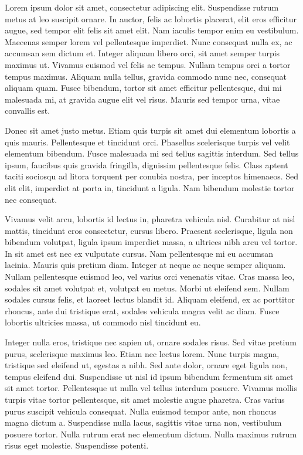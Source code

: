 

Lorem ipsum dolor sit amet, consectetur adipiscing elit. Suspendisse rutrum metus at leo suscipit ornare. In auctor, felis ac lobortis placerat, elit eros efficitur augue, sed tempor elit felis sit amet elit. Nam iaculis tempor enim eu vestibulum. Maecenas semper lorem vel pellentesque imperdiet. Nunc consequat nulla ex, ac accumsan sem dictum et. Integer aliquam libero orci, sit amet semper turpis maximus ut. Vivamus euismod vel felis ac tempus. Nullam tempus orci a tortor tempus maximus. Aliquam nulla tellus, gravida commodo nunc nec, consequat aliquam quam. Fusce bibendum, tortor sit amet efficitur pellentesque, dui mi malesuada mi, at gravida augue elit vel risus. Mauris sed tempor urna, vitae convallis est.

Donec sit amet justo metus. Etiam quis turpis sit amet dui elementum lobortis a quis mauris. Pellentesque et tincidunt orci. Phasellus scelerisque turpis vel velit elementum bibendum. Fusce malesuada mi sed tellus sagittis interdum. Sed tellus ipsum, faucibus quis gravida fringilla, dignissim pellentesque felis. Class aptent taciti sociosqu ad litora torquent per conubia nostra, per inceptos himenaeos. Sed elit elit, imperdiet at porta in, tincidunt a ligula. Nam bibendum molestie tortor nec consequat. 

Vivamus velit arcu, lobortis id lectus in, pharetra vehicula nisl. Curabitur at nisl mattis, tincidunt eros consectetur, cursus libero. Praesent scelerisque, ligula non bibendum volutpat, ligula ipsum imperdiet massa, a ultrices nibh arcu vel tortor. In sit amet est nec ex vulputate cursus. Nam pellentesque mi eu accumsan lacinia. Mauris quis pretium diam. Integer at neque ac neque semper aliquam. Nullam pellentesque euismod leo, vel varius orci venenatis vitae. Cras massa leo, sodales sit amet volutpat et, volutpat eu metus. Morbi ut eleifend sem. Nullam sodales cursus felis, et laoreet lectus blandit id. Aliquam eleifend, ex ac porttitor rhoncus, ante dui tristique erat, sodales vehicula magna velit ac diam. Fusce lobortis ultricies massa, ut commodo nisl tincidunt eu.

 Integer nulla eros, tristique nec sapien ut, ornare sodales risus. Sed vitae pretium purus, scelerisque maximus leo. Etiam nec lectus lorem. Nunc turpis magna, tristique sed eleifend ut, egestas a nibh. Sed ante dolor, ornare eget ligula non, tempus eleifend dui. Suspendisse ut nisl id ipsum bibendum fermentum sit amet sit amet tortor. Pellentesque ut nulla vel tellus interdum posuere. Vivamus mollis turpis vitae tortor pellentesque, sit amet molestie augue pharetra. Cras varius purus suscipit vehicula consequat. Nulla euismod tempor ante, non rhoncus magna dictum a. Suspendisse nulla lacus, sagittis vitae urna non, vestibulum posuere tortor. Nulla rutrum erat nec elementum dictum. Nulla maximus rutrum risus eget molestie. Suspendisse potenti.
 
